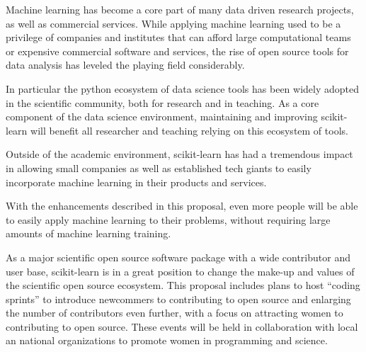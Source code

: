 Machine learning has become a core part of many data driven research projects,
as well as commercial services. While applying machine learning used to be
a privilege of companies and institutes that can afford large computational
teams or expensive commercial software and services, the rise of open
source tools for data analysis has leveled the playing field considerably.

In particular the python ecosystem of data science tools has been widely
adopted in the scientific community, both for research and in teaching.
As a core component of the data science environment, maintaining and
improving scikit-learn will benefit all researcher and teaching relying
on this ecosystem of tools.

Outside of the academic environment, scikit-learn has had a tremendous
impact in allowing small companies as well as established tech giants
to easily incorporate machine learning in their products and services.

With the enhancements described in this proposal, even more people
will be able to easily apply machine learning to their problems,
without requiring large amounts of machine learning training.

As a major scientific open source software package with a wide contributor
and user base, scikit-learn is in a great position to change
the make-up and values of the scientific open source ecosystem.
This proposal includes plans to host ``coding sprints'' to introduce
newcommers to contributing to open source and enlarging the
number of contributors even further, with a focus on attracting
women to contributing to open source. These events will be held
in collaboration with local an national organizations to promote
women in programming and science.


